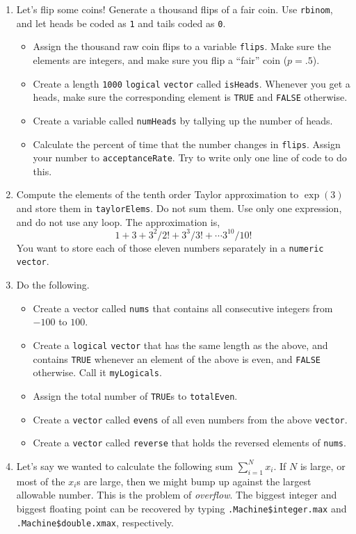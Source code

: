 \documentclass[12pt,krantz2]{krantz}
\providecommand{\tightlist}{%
  \setlength{\itemsep}{0pt}\setlength{\parskip}{0pt}}
\begin{document}
\begin{enumerate}
\def\labelenumi{\arabic{enumi}.}
\item
  Let's flip some coins! Generate a thousand flips of a fair coin. Use \texttt{rbinom}, and let heads be coded as \texttt{1} and tails coded as \texttt{0}.

  \begin{itemize}
  \tightlist
  \item
    Assign the thousand raw coin flips to a variable \texttt{flips}. Make sure the elements are integers, and make sure you flip a ``fair'' coin (\(p=.5\)).
  \item
    Create a length \texttt{1000} \texttt{logical} \texttt{vector} called \texttt{isHeads}. Whenever you get a heads, make sure the corresponding element is \texttt{TRUE} and \texttt{FALSE} otherwise.
  \item
    Create a variable called \texttt{numHeads} by tallying up the number of heads.
  \item
    Calculate the percent of time that the number changes in \texttt{flips}. Assign your number to \texttt{acceptanceRate}. Try to write only one line of code to do this.
  \end{itemize}
\item
  Compute the elements of the tenth order Taylor approximation to \(\exp(3)\) and store them in \texttt{taylorElems}. Do not sum them. Use only one expression, and do not use any loop. The approximation is,\\
  \[
  1 + 3 + 3^2/2! + 3^3/3! + \cdots 3^{10}/10!
  \]
  You want to store each of those eleven numbers separately in a \texttt{numeric} \texttt{vector}.
\item
  Do the following.

  \begin{itemize}
  \tightlist
  \item
    Create a vector called \texttt{nums} that contains all consecutive integers from \(-100\) to \(100\).
  \item
    Create a \texttt{logical} \texttt{vector} that has the same length as the above, and contains \texttt{TRUE} whenever an element of the above is even, and \texttt{FALSE} otherwise. Call it \texttt{myLogicals}.
  \item
    Assign the total number of \texttt{TRUE}s to \texttt{totalEven}.
  \item
    Create a \texttt{vector} called \texttt{evens} of all even numbers from the above \texttt{vector}.
  \item
    Create a \texttt{vector} called \texttt{reverse} that holds the reversed elements of \texttt{nums}.
  \end{itemize}
\item
  Let's say we wanted to calculate the following sum \(\sum_{i=1}^N x_i\). If \(N\) is large, or most of the \(x_i\)s are large, then we might bump up against the largest allowable number. This is the problem of \emph{overflow}. The biggest integer and biggest floating point can be recovered by typing \texttt{.Machine\$integer.max} and \texttt{.Machine\$double.xmax}, respectively.


\end{enumerate}
\end{document}
